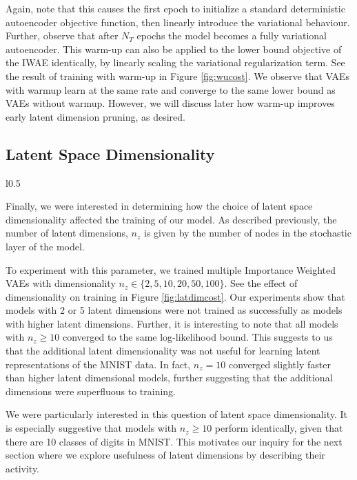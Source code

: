 \documentclass{article} %
\numberwithin{figure}{section}
\begin{document}
Again, note that this causes the first epoch to initialize a standard deterministic autoencoder objective function, then linearly introduce the variational behaviour. Further, observe that after $N_T$ epochs the model becomes a fully variational autoencoder. This warm-up can also be applied to the lower bound objective of the IWAE identically, by linearly scaling the variational regularization term. See the result of training with warm-up in Figure \ref{fig:wucost}. We observe that VAEs with warmup learn at the same rate and converge to the same lower bound as VAEs without warmup. However, we will discuss later how warm-up improves early latent dimension pruning, as desired. 


\subsection{Latent Space Dimensionality}
\begin{wrapfigure}{l}{0.5\textwidth}
  \resizebox{\linewidth}{!}{}
  \caption{Latent Dimensionality}
  \label{fig:latdimcost}
\end{wrapfigure}
Finally, we were interested in determining how the choice of latent space dimensionality affected the training of our model. As described previously, the number of latent dimensions, $n_z$ is given by the number of nodes in the stochastic layer of the model.
\par To experiment with this parameter, we trained multiple Importance Weighted VAEs with dimensionality ${n_z \in \{2,5,10,20,50,100\}}$. See the effect of dimensionality on training in Figure \ref{fig:latdimcost}. Our experiments show that models with 2 or 5 latent dimensions were not trained as successfully as models with higher latent dimensions. Further, it is interesting to note that all models with $n_z\geq10$ converged to the same log-likelihood bound. This suggests to us that the additional latent dimensionality was not useful for learning latent representations of the MNIST data. In fact, $n_z=10$ converged slightly faster than higher latent dimensional models, further suggesting that the additional dimensions were superfluous to training.
\par We were particularly interested in this question of latent space dimensionality. It is especially suggestive that models with $n_z\geq10$ perform identically, given that there are 10 classes of digits in MNIST. This motivates our inquiry for the next section where we explore usefulness of latent dimensions by describing their activity.
\end{document}
